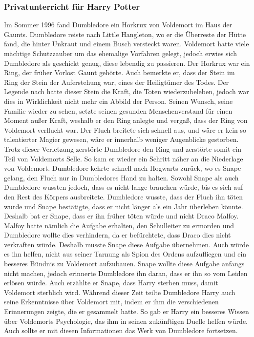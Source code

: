 \documentclass[a4paper, 10pt]{article}
\begin{document}
\subsubsection*{Privatunterricht für Harry Potter}
Im Sommer 1996 fand Dumbledore ein Horkrux von Voldemort im Haus der Gaunts. Dumbledore reiste nach Little Hangleton, wo er die Überreste der Hütte fand, die hinter Unkraut und einem Busch versteckt waren. Voldemort hatte viele mächtige Schutzzauber um das ehemalige Vorfahren gelegt, jedoch erwies sich Dumbledore als geschickt genug, diese lebendig zu passieren. Der Horkrux war ein Ring, der früher Vorlost Gaunt gehörte. Auch bemerkte er, dass der Stein im Ring der Stein der Auferstehung war, eines der Heiligtümer des Todes.
\vspace{10pt}
\newline
Der Legende nach hatte dieser Stein die Kraft, die Toten wiederzubeleben, jedoch war dies in Wirklichkeit nicht mehr ein Abbild der Person. Seinen Wunsch, seine Familie wieder zu sehen, setzte seinen gesunden Menschenverstand für einen Moment außer Kraft, weshalb er den Ring anlegte und vergaß, dass der Ring von Voldemort verflucht war. Der Fluch breitete sich schnell aus, und wäre er kein so talentierter Magier gewesen, wäre er innerhalb weniger Augenblicke gestorben. Trotz dieser Verletzung zerstörte Dumbledore den Ring und zerstörte somit ein Teil von Voldemorts Selle. So kam er wieder ein Schritt näher an die Niederlage von Voldemort.
\vspace{10pt}
\newline
Dumbledore kehrte schnell nach Hogwarts zurück, wo es Snape gelang, den Fluch nur in Dumbledores Hand zu halten. Sowohl Snape als auch Dumbledore wussten jedoch, dass es nicht lange brauchen würde, bis es sich auf den Rest des Körpers ausbreitete. Dumbledore wusste, dass der Fluch ihn töten wurde und Snape bestätigte, dass er nicht länger als ein Jahr überleben könnte. Deshalb bat er Snape, dass er ihn früher töten würde und nicht Draco Malfoy. Malfoy hatte nämlich die Aufgabe erhalten, den Schulleiter zu ermorden und Dumbledore wollte dies verhindern, da er befürchtete, dass Draco dies nicht verkraften würde. Deshalb musste Snape diese Aufgabe übernehmen. Auch würde es ihn helfen, nicht aus seiner Tarnung als Spion des Ordens aufzufliegen und ein besseres Bündnis zu Voldemort aufzubauen. Snape wollte diese Aufgabe anfangs nicht machen, jedoch erinnerte Dumbledore ihn daran, dass er ihn so vom Leiden erlösen würde. Auch erzählte er Snape, dass Harry sterben muss, damit Voldemort sterblich wird. Während dieser Zeit teilte Dumbledore Harry auch seine Erkenntnisse über Voldemort mit, indem er ihm die verschiedenen Erinnerungen zeigte, die er gesammelt hatte. So gab er Harry ein besseres Wissen über Voldemorts Psychologie, das ihm in seinen zukünftigen Duelle helfen würde. Auch sollte er mit diesen Informationen das Werk von Dumbledore fortsetzen.
\end{document}
